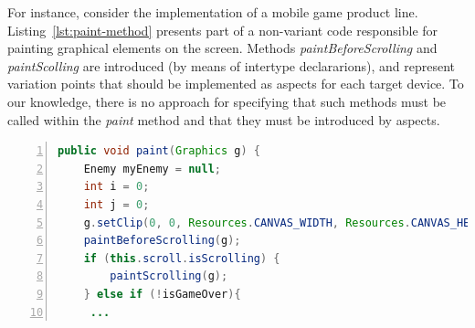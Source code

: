 For instance, consider the implementation of a mobile
game product line. Listing~\ref{lst:paint-method} presents part of 
a non-variant code responsible for painting graphical elements 
on the screen. Methods \emph{paintBeforeScrolling} and
\emph{paintScolling} are introduced (by means of intertype declararions),
and represent variation points that should be implemented as aspects for each 
target device. To our knowledge, there is no approach for specifying that such methods must be called 
within the \emph{paint} method and that they must be introduced by aspects. 

\scriptsize
\begin{lstlisting}[frame=single, caption={Dependency of a base code to an aspect code.},label=lst:paint-method, numbers=left, language=Java]
 public void paint(Graphics g) {
	Enemy myEnemy = null;
	int i = 0;
	int j = 0;
	g.setClip(0, 0, Resources.CANVAS_WIDTH, Resources.CANVAS_HEIGHT);
	paintBeforeScrolling(g);
	if (this.scroll.isScrolling) {
	 	paintScrolling(g);
	} else if (!isGameOver){
	 ...
\end{lstlisting}

\normalsize

